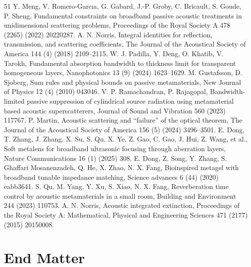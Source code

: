 \documentclass[final,5p,times,twocolumn]{elsarticle}
\begin{document}
\begin{thebibliography}{51}
	 Y. Meng, V. Romero-Garcıa, G. Gabard, J.-P. Groby, C. Bricault, S. Goude, P. Sheng, Fundamental constraints on broadband passive acoustic treatments in unidimensional scattering problems, Proceedings of the Royal Society A 478 (2265) (2022) 20220287.
	 A. N. Norris, Integral identities for reflection, transmission, and scattering coefficients, The Journal of the Acoustical Society of America 144 (4) (2018) 2109--2115.
	 W. J. Padilla, Y. Deng, O. Khatib, V. Tarokh, Fundamental absorption bandwidth to thickness limit for transparent homogeneous layers, Nanophotonics 13 (9) (2024) 1623--1629.
	 M. Gustafsson, D. Sjoberg, Sum rules and physical bounds on passive metamaterials, New Journal of Physics 12 (4) (2010) 043046.
	 V. P. Ramachandran, P. Rajagopal, Bandwidth-limited passive suppression of cylindrical source radiation using metamaterial based acoustic superscatterers, Journal of Sound and Vibration 560 (2023) 117767.
	 P. Martin, Acoustic scattering and “failure” of the optical theorem, The Journal of the Acoustical Society of America 156 (5) (2024) 3496--3501.
	 E. Dong, T. Zhang, J. Zhang, X. Su, S. Qu, X. Ye, Z. Gao, C. Gao, J. Hui, Z. Wang, et al., Soft metalens for broadband ultrasonic focusing through aberration layers, Nature Communications 16 (1) (2025) 308.
	 E. Dong, Z. Song, Y. Zhang, S. Ghaffari Mosanenzadeh, Q. He, X. Zhao, N. X. Fang, Bioinspired metagel with broadband tunable impedance matching, Science advances 6 (44) (2020) eabb3641.
	 S. Qu, M. Yang, Y. Xu, S. Xiao, N. X. Fang, Reverberation time control by acoustic metamaterials in a small room, Building and Environment 244 (2023) 110753.
	 A. N. Norris, Acoustic integrated extinction, Proceedings of the Royal Society A: Mathematical, Physical and Engineering Sciences 471 (2177) (2015) 20150008.
\end{thebibliography}







\setcounter{equation}{0}
\renewcommand{\theequation}{A\arabic{equation}}
\renewcommand{\thetable}{A\arabic{table}}
\onecolumn
\newpage

\twocolumn

\section*{End Matter}
\end{document}
